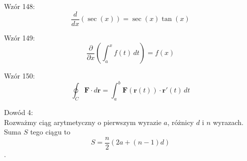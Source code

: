 \documentclass{article}
\begin{document}
Wzór 148:
\[ \frac{d}{dx}\left(\sec(x)\right) = \sec(x) \tan(x) \]

Wzór 149:
\[ \frac{\partial}{\partial x}\left(\int_{a}^{x} f(t) \,dt\right) = f(x) \]

Wzór 150:
\[ \oint_C \mathbf{F} \cdot d\mathbf{r} = \int_{a}^{b} \mathbf{F}(\mathbf{r}(t)) \cdot \mathbf{r}'(t) \,dt \]

Dowód 4: \\
Rozważmy ciąg arytmetyczny o pierwszym wyrazie \( a \), różnicy \( d \) i \( n \) wyrazach. Suma \( S \) tego ciągu to
\[ S = \frac{n}{2}(2a + (n-1)d) \].
\end{document}
